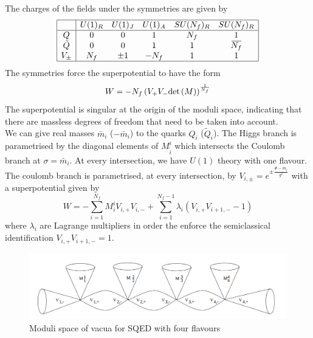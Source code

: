 The charges of the fields under the symmetries are given by
 \begin{equation}
 \begin{array}{ | c | c c c c c |}
 \hline
  & U(1)_R &  U(1)_J & U(1)_A & SU(N_f)_R & SU(N_f)_R \\
 \hline
 Q & 0 & 0  & 1 & N_f & 1  \\  
 \tilde{Q} & 0 & 0  & 1 & 1 & \overbar{N_f}  \\  
   V_{\pm} & N_f & \pm 1  & -N_f & 1  &  1\\
   \hline
 \end{array}
\end{equation}
The symmetries force the superpotential to have the form
\begin{equation}
W = - N_f \left(  V_+ V_- \mathrm{det } \,{ (M)} \right)^{\frac{1}{N_f}}
\label{eqn:moduli_space_u1_nfsuperpotential}
\end{equation}
The superpotential is singular at the origin of the moduli space, indicating that there are massless degrees of freedom that need to be taken into account.\\
We can give real masses $\bar{m}_i$ ($-\bar{m}_i$) to the quarks $Q_i$ ($\tilde{Q}_i$).
The Higgs branch is parametrised by the diagonal elements of $M^i_{\tilde{i}}$ which intersects the Coulomb branch at $\sigma = \bar{m}_i$.
At every intersection, we have $U(1)$ theory with one flavour.
The coulomb branch is parametrised, at every intersection, by $V_{i,\pm} = e^{\pm \frac{\Phi - \bar{m}_i}{g^2}} $ with a superpotential given by
\begin{equation}
W = - \sum_{i = 1}^{N_f} M^i_i V_{i,+} V_{i,-} + \sum_{i=1}^{N_f - 1} \lambda_i \left(    V_{i,+} V_{i+1,-} - 1\right)
\end{equation}
where $\lambda_i$ are Lagrange multipliers in order the enforce the semiclassical identification  $ V_{i,+} V_{i+1,-} = 1 $.

\begin{figure}[h!]
\centering
\includegraphics[scale=0.5]{u1_moduli_space_flavours.png}
\caption{Moduli space of vacua for SQED with four flavours}
\end{figure}

















